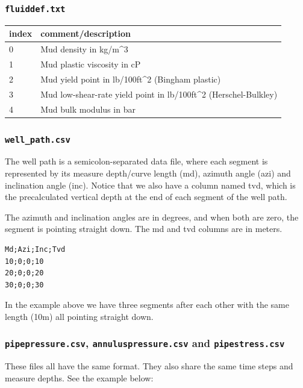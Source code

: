 \hypertarget{fluiddef.txt}{%
\subsubsection{\texorpdfstring{\texttt{fluiddef.txt}}{fluiddef.txt}}\label{fluiddef.txt}}

\begin{longtable}[]{@{}ll@{}}
\toprule
index & comment/description\tabularnewline
\midrule
\endhead
0 & Mud density in kg/m\^{}3\tabularnewline
1 & Mud plastic viscosity in cP\tabularnewline
2 & Mud yield point in lb/100ft\^{}2 (Bingham plastic)\tabularnewline
3 & Mud low-shear-rate yield point in lb/100ft\^{}2
(Herschel-Bulkley)\tabularnewline
4 & Mud bulk modulus in bar\tabularnewline
\bottomrule
\end{longtable}

\hypertarget{well_path.csv}{%
\subsubsection{\texorpdfstring{\texttt{well\_path.csv}}{well\_path.csv}}\label{well_path.csv}}

The well path is a semicolon-separated data file, where each segment is
represented by its measure depth/curve length (md), azimuth angle (azi)
and inclination angle (inc). Notice that we also have a column named
tvd, which is the precalculated vertical depth at the end of each
segment of the well path.

The azimuth and inclination angles are in degrees, and when both are
zero, the segment is pointing straight down. The md and tvd columns are
in meters.

\begin{verbatim}
Md;Azi;Inc;Tvd
10;0;0;10
20;0;0;20
30;0;0;30
\end{verbatim}

In the example above we have three segments after each other with the
same length (10m) all pointing straight down.

\hypertarget{pipepressure.csv-annuluspressure.csv-and-pipestress.csv}{%
\subsubsection{\texorpdfstring{\texttt{pipepressure.csv},
\texttt{annuluspressure.csv} and
\texttt{pipestress.csv}}{pipepressure.csv, annuluspressure.csv and pipestress.csv}}\label{pipepressure.csv-annuluspressure.csv-and-pipestress.csv}}

These files all have the same format. They also share the same time
steps and measure depths. See the example below:

